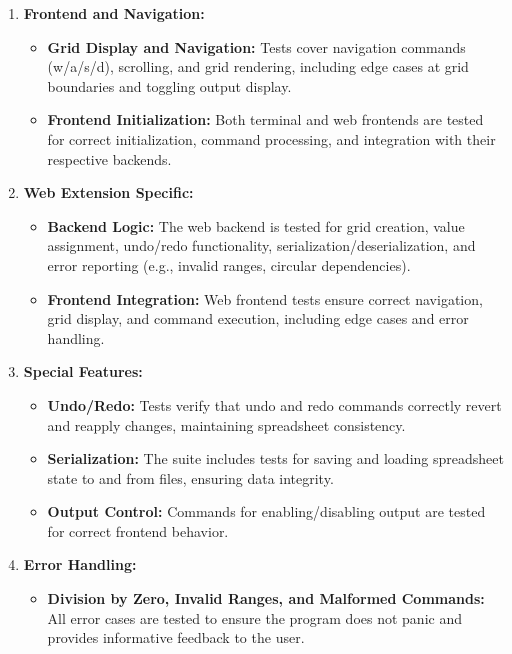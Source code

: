 \documentclass{article}
\begin{document}
\begin{enumerate}
    \item \textbf{Frontend and Navigation:}
    \begin{itemize}
        \item \textbf{Grid Display and Navigation:} Tests cover navigation commands (w/a/s/d), scrolling, and grid rendering, including edge cases at grid boundaries and toggling output display.
        \item \textbf{Frontend Initialization:} Both terminal and web frontends are tested for correct initialization, command processing, and integration with their respective backends.
    \end{itemize}

    \item \textbf{Web Extension Specific:}
    \begin{itemize}
        \item \textbf{Backend Logic:} The web backend is tested for grid creation, value assignment, undo/redo functionality, serialization/deserialization, and error reporting (e.g., invalid ranges, circular dependencies).
        \item \textbf{Frontend Integration:} Web frontend tests ensure correct navigation, grid display, and command execution, including edge cases and error handling.
    \end{itemize}

    \item \textbf{Special Features:}
    \begin{itemize}
        \item \textbf{Undo/Redo:} Tests verify that undo and redo commands correctly revert and reapply changes, maintaining spreadsheet consistency.
        \item \textbf{Serialization:} The suite includes tests for saving and loading spreadsheet state to and from files, ensuring data integrity.
        \item \textbf{Output Control:} Commands for enabling/disabling output are tested for correct frontend behavior.
    \end{itemize}

    \item \textbf{Error Handling:}
    \begin{itemize}
        \item \textbf{Division by Zero, Invalid Ranges, and Malformed Commands:} All error cases are tested to ensure the program does not panic and provides informative feedback to the user.
    \end{itemize}
\end{enumerate}
\end{document}
